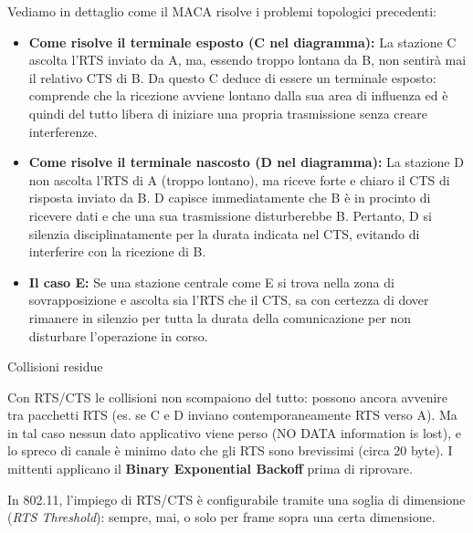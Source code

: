 \documentclass[
  italian,
  openany]{book}
\providecommand{\tightlist}{%
  \setlength{\itemsep}{0pt}\setlength{\parskip}{0pt}}
\begin{document}
Vediamo in dettaglio come il MACA risolve i problemi topologici
precedenti:

\begin{itemize}
\tightlist
\item
  \textbf{Come risolve il terminale esposto (C nel diagramma):} La
  stazione C ascolta l'RTS inviato da A, ma, essendo troppo lontana da
  B, non sentirà mai il relativo CTS di B. Da questo C deduce di essere
  un terminale esposto: comprende che la ricezione avviene lontano dalla
  sua area di influenza ed è quindi del tutto libera di iniziare una
  propria trasmissione senza creare interferenze.
\item
  \textbf{Come risolve il terminale nascosto (D nel diagramma):} La
  stazione D non ascolta l'RTS di A (troppo lontano), ma riceve forte e
  chiaro il CTS di risposta inviato da B. D capisce immediatamente che B
  è in procinto di ricevere dati e che una sua trasmissione
  disturberebbe B. Pertanto, D si silenzia disciplinatamente per la
  durata indicata nel CTS, evitando di interferire con la ricezione di
  B.
\item
  \textbf{Il caso E:} Se una stazione centrale come E si trova nella
  zona di sovrapposizione e ascolta sia l'RTS che il CTS, sa con
  certezza di dover rimanere in silenzio per tutta la durata della
  comunicazione per non disturbare l'operazione in corso.
\end{itemize}

\begin{callouttip}{Collisioni residue}

Con RTS/CTS le collisioni non scompaiono del tutto: possono ancora
avvenire tra pacchetti RTS (es. se C e D inviano contemporaneamente RTS
verso A). Ma in tal caso nessun dato applicativo viene perso (NO DATA
information is lost), e lo spreco di canale è minimo dato che gli RTS
sono brevissimi (circa 20 byte). I mittenti applicano il \textbf{Binary
Exponential Backoff} prima di riprovare.

\end{callouttip}

In 802.11, l'impiego di RTS/CTS è configurabile tramite una soglia di
dimensione (\emph{RTS Threshold}): sempre, mai, o solo per frame sopra
una certa dimensione.

\newpage

\backmatter
\end{document}
